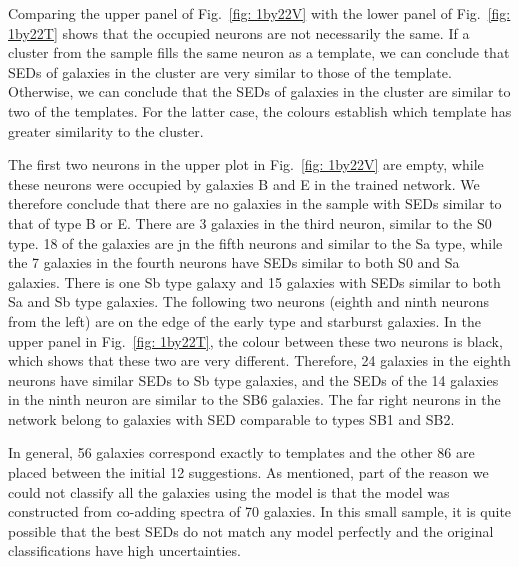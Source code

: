             Comparing the upper panel of Fig.~\ref{fig: 1by22V} with the lower panel of Fig.~\ref{fig: 1by22T} shows that the occupied neurons are not necessarily the same.
            If a cluster from the  sample fills the same neuron as a  template, we can conclude that SEDs of galaxies in the cluster are very similar to those of the template.
            Otherwise, we can conclude that the SEDs of galaxies in the cluster are similar to two of the  templates.
            For the latter case, the colours establish which template has greater similarity to the  cluster.
            
            The first two neurons in the upper plot in Fig.~\ref{fig: 1by22V} are empty, while these neurons were occupied by galaxies B and E in the trained network.
            We therefore conclude that there are no galaxies in the  sample with SEDs similar to that of type B or E.
            There are 3 galaxies in the third neuron, similar to the S0 type. 
            18 of the galaxies are jn the fifth neurons and similar to the Sa type, while the 7 galaxies in the fourth neurons have SEDs similar to both S0 and Sa galaxies.
            There is one Sb type galaxy and 15 galaxies with SEDs similar to both Sa and Sb type galaxies.
            The following two neurons (eighth and ninth neurons from the left) are on the edge of the early type and starburst galaxies.
            In the upper panel in Fig.~\ref{fig: 1by22T}, the colour between these two neurons is black, which shows that these two are very different.
            Therefore, 24 galaxies in the eighth neurons have similar SEDs to Sb type galaxies, and the SEDs of the 14 galaxies in the ninth neuron are similar to the SB6 galaxies.
            The far right neurons in the network belong to galaxies with SED comparable to types SB1 and SB2.
            
            In general, 56 galaxies correspond exactly to  templates and the other 86 are placed between the initial 12 suggestions.
            As  mentioned, part of the reason we could not classify all the galaxies using the  model is that the model was constructed from co-adding spectra of 70 galaxies.
            In this small sample, it is quite possible that the best SEDs do not match any model perfectly and the original classifications have high uncertainties.
            

